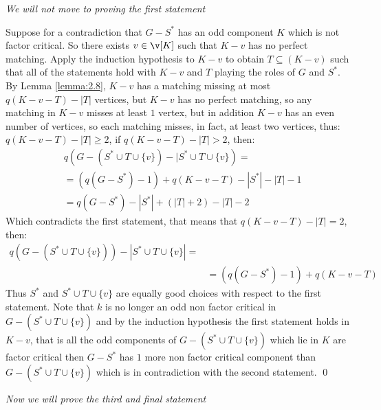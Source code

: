 \begin{prf}
    \textit{We will not move to proving the first statement}

    Suppose for a contradiction that $G - S^*$ has an odd component $K$ which is not factor critical. So there exists $v \in \v[K]$ such that $K - v$ has no perfect matching. Apply the induction hypothesis to $K - v$ to obtain $T \subseteq (K - v)$ such that all of the statements hold with $K - v$ and $T$ playing the roles of $G$ and $S^*$. By Lemma \ref{lemma:2.8}, $K - v$ has a matching missing at most $\mathit{q}(K - v - T) - |T|$ vertices, but $K - v$ has no perfect matching, so any matching in $K - v$ misses at least $1$ vertex, but in addition $K - v$ has an even number of vertices, so each matching misses, in fact, at least two vertices, thus: $\mathit{q}(K - v - T) - |T| \geq 2$, if $\mathit{q}(K - v - T) - |T| > 2$, then:
    \begin{align*}
        &\mathit{q}(G - (S^* \cup T \cup \{v\}) - |S^* \cup T \cup \{v\}) =\\
        &= (\mathit{q}(G - S^*) - 1) + \mathit{q}(K - v - T) - |S^*| - |T| - 1\\
        &= \mathit{q}(G - S^*) - |S^*| + (|T| + 2) - |T| - 2 
    \end{align*}
    Which contradicts the first statement, that means that $\mathit{q}(K - v - T) - |T| = 2$, then:
    \begin{align*}
        \mathit{q}(G - (S^* \cup T \cup \{v\})) - |S^* \cup T \cup \{v\}| =\\
        &=(\mathit{q}(G - S^*) - 1) + \mathit{q}(K - v - T)
    \end{align*}
    Thus $S^*$ and $S^* \cup T \cup \{v\}$ are equally good choices with respect to the first statement. Note that $k$ is no longer an odd non factor critical in $G - (S^* \cup T \cup \{v\})$ and by the induction hypothesis the first statement holds in $K - v$, that is all the odd components of $G - (S^* \cup T \cup \{v\})$ which lie in $K$ are factor critical then $G - S^*$ has $1$ more non factor critical component than $G - (S^* \cup T \cup \{v\})$ which is in contradiction with the second statement. \qed

    \textit{Now we will prove the third and final statement}


\end{prf}
